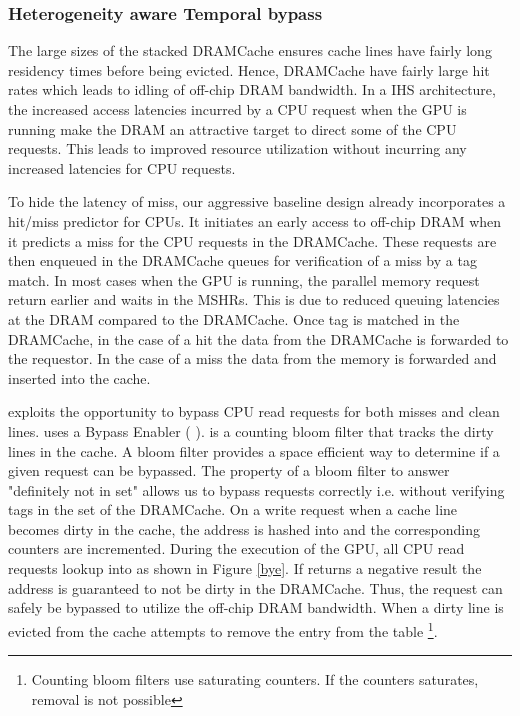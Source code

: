 \subsubsection{Heterogeneity aware Temporal bypass}
The large sizes of the stacked DRAMCache ensures cache lines have fairly long residency times before being evicted. Hence, DRAMCache have fairly large hit rates which leads to idling of off-chip DRAM bandwidth.
In a IHS architecture, the increased access latencies incurred by a CPU request when the GPU is running make the DRAM an attractive target to direct some of the CPU requests. This leads to improved resource utilization without incurring any increased latencies for CPU requests. 
\par To hide the latency of miss, our aggressive baseline design already incorporates a hit/miss predictor for CPUs. It initiates an early access to off-chip DRAM when it predicts a miss for the CPU requests in the DRAMCache. These requests are then enqueued in the DRAMCache queues for verification of a miss by a tag match. 
In most cases when the GPU is running, the parallel memory request return earlier and waits in the MSHRs. This is due to reduced queuing latencies at the DRAM compared to the DRAMCache. Once tag is matched in the DRAMCache, in the case of a hit the data from the DRAMCache is forwarded to the requestor. In the case of a miss the data from the memory is forwarded and inserted into the cache. 
\par \cachename exploits the opportunity to bypass CPU read requests for both misses and clean lines. \cachename uses a Bypass Enabler ( \bypassname). \bypassname is a counting bloom filter that tracks the dirty lines in the cache. A bloom filter provides a space efficient way to determine if a given request can be bypassed. The property of a bloom filter to answer "definitely not in set" allows us to bypass requests correctly i.e. without verifying tags in the set of the DRAMCache. 
On a write request when a cache line becomes dirty in the cache, the address is hashed into \bypassname and the corresponding counters are incremented. 
During the execution of the GPU, all CPU read requests lookup into \bypassname as shown in Figure \ref{bye}. If \bypassname returns a  negative result the address is guaranteed to not be dirty in the DRAMCache. Thus, the request can safely be bypassed to utilize the off-chip DRAM bandwidth. 
When a dirty line is evicted from the cache \bypassname attempts to remove the entry from the table \footnote{Counting bloom filters use saturating counters. If the counters saturates, removal is not possible}.
